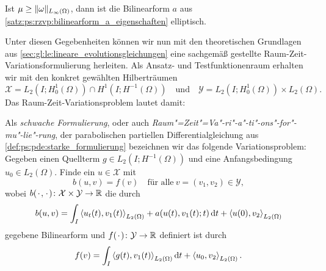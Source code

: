 \begin{Korollar}
\label{kor:ps:rzvp:bilinearform_elliptisch}
    Ist $\mu \geq \lVert\omega\rVert_{L_{\infty}(\Omega)}$, dann ist die Bilinearform $a$ aus \cref{satz:ps:rzvp:bilinearform_a_eigenschaften} elliptisch.
\end{Korollar}

Unter diesen Gegebenheiten können wir nun mit den theoretischen Grundlagen aus \cref{sec:gl:le:lineare_evolutionsgleichungen} eine sachgemäß gestellte Raum-Zeit-Variationsformulierung herleiten.
Als Ansatz- und Testfunktionenraum erhalten wir mit den konkret gewählten Hilberträumen
\begin{equation}
    \label{eq:ps:rzvp:ansatzraum_testraum}
    \mathcal X = L_{2}(I; H^{1}_{0}(\Omega)) \cap H^{1}(I; H^{-1}(\Omega))
    \quad \text{und} \quad
    \mathcal Y = L_{2}(I; H^{1}_{0}(\Omega)) \times L_{2}(\Omega).
\end{equation}
Das Raum-Zeit-Variationsproblem lautet damit:
\begin{Definition}
\label{def:ps:rzvp:schwache_formulierung}
    Als \emph{schwache Formulierung}, oder auch \emph{Raum"=Zeit"=Va"-ri"-a"-ti"-ons"-for"-mu"-lie"-rung}, der parabolischen partiellen Differentialgleichung aus \cref{def:ps:pde:starke_formulierung} bezeichnen wir das folgende Variationsproblem:
    Gegeben einen Quellterm $g \in L_{2}(I; H^{-1}(\Omega))$ und eine Anfangsbedingung $u_{0} \in L_{2}(\Omega)$.
    Finde ein $u \in \mathcal X$ mit
    \begin{equation}
        \label{eq:ps:rzvp:schwache_formulierung}
        b(u, v) = f(v) \quad \text{für alle}~v = (v_{1}, v_{2}) \in \mathcal Y,
    \end{equation}
    wobei $b({\mkern2mu\cdot\mkern2mu}, {\mkern2mu\cdot\mkern2mu}) \colon \mathcal X \times \mathcal Y \to \mathbb{R}$ die durch
    \begin{equation}
        \label{eq:ps:rzvp:schwache_formulierung_lhs_b}
        b(u, v)
            = \int_{I} \left\langle u_{t}(t),v_{1}(t)\right\rangle_{L_{2}(\Omega)} + a(u(t), v_{1}(t); t) \mathop{}\!\mathrm{d} t + \left\langle u(0),v_{2}\right\rangle_{L_{2}(\Omega)}
    \end{equation}
    gegebene Bilinearform und $f({\mkern2mu\cdot\mkern2mu}) \colon \mathcal Y \to \mathbb{R}$ definiert ist durch
    \begin{equation}
        \label{eq:ps:rzvp:schwache_formulierung_rhs_f}
        f(v) = \int_{I} \left\langle g(t),v_{1}(t)\right\rangle_{L_{2}(\Omega)} \mathop{}\!\mathrm{d} t + \left\langle u_{0},v_{2}\right\rangle_{L_{2}(\Omega)}.
    \end{equation}
\end{Definition}

